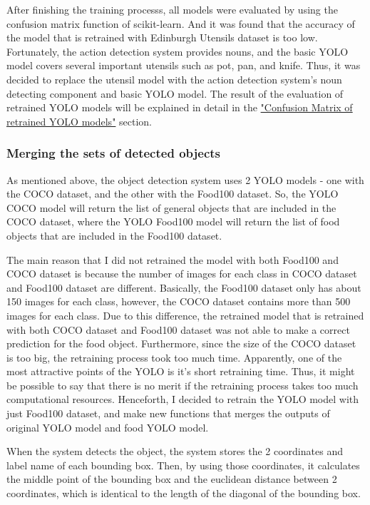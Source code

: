 \documentclass{article}
\begin{document}
After finishing the training processs, all models were evaluated by using the confusion matrix function of scikit-learn. And it was found that the accuracy of the model that is retrained with Edinburgh Utensils dataset is too low. Fortunately, the action detection system provides nouns, and the basic YOLO model covers several important utensils such as pot, pan, and knife. Thus, it was decided to replace the utensil model with the action detection system's noun detecting component and basic YOLO model. The result of the evaluation of retrained YOLO models will be explained in detail in the \hyperlink{evaluate_yolo_with_cm}{"Confusion Matrix of retrained YOLO models"} section.

\subsubsection{Merging the sets of detected objects}

As mentioned above, the object detection system uses 2 YOLO models - one with the COCO dataset, and the other with the Food100 dataset. So, the YOLO COCO model will return the list of general objects that are included in the COCO dataset, where the YOLO Food100 model will return the list of food objects that are included in the Food100 dataset.

The main reason that I did not retrained the model with both Food100 and COCO dataset is because the number of images for each class in COCO dataset and Food100 dataset are different. Basically, the Food100 dataset only has about 150 images for each class, however, the COCO dataset contains more than 500 images for each class. Due to this difference, the retrained model that is retrained with both COCO dataset and Food100 dataset was not able to make a correct prediction for the food object. Furthermore, since the size of the COCO dataset is too big, the retraining process took too much time. Apparently, one of the most attractive points of the YOLO is it's short retraining time. Thus, it might be possible to say that there is no merit if the retraining process takes too much computational resources. Henceforth, I decided to retrain the YOLO model with just Food100 dataset, and make new functions that merges the outputs of original YOLO model and food YOLO model.

When the system detects the object, the system stores the 2 coordinates and label name of each bounding box. Then, by using those coordinates, it calculates the middle point of the bounding box and the euclidean distance between 2 coordinates, which is identical to the length of the diagonal of the bounding box. 
\end{document}
